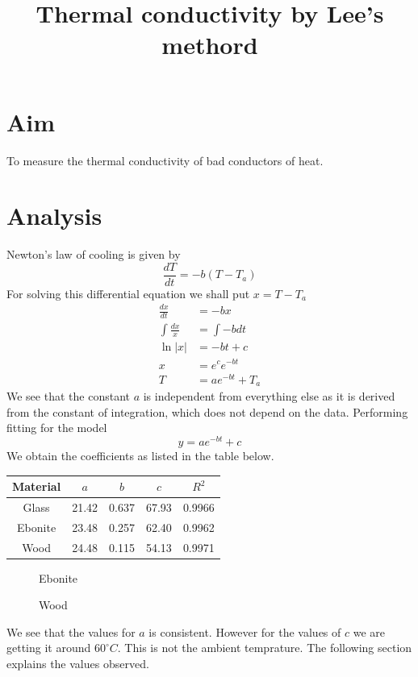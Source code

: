 \documentclass[12pt]{article}
\newlength\fwidth
\newlength\fheight
\begin{document}
\author{}
\date{}
\title{Thermal conductivity by Lee's methord}
\maketitle
\section*{Aim}
To measure the thermal conductivity of bad conductors of heat.
\section*{Analysis}
Newton's law of cooling is given by 
\[\frac{dT}{dt} = -b(T-T_a)\]
For solving this differential equation we shall put $x = T-T_a$
\begin{align*}
    \frac{dx}{dt} &= -bx \\
    \int \frac{dx}{x} &= \int -b dt \\
    \ln |x| &= -bt + c \\
    x &= e^ce^{-bt} \\
    T &= ae^{-bt} +T_a
\end{align*}
We see that the constant $a$ is independent from everything else as it is derived from the constant of integration, which does not depend on the data. 
Performing fitting for the model
\[y = ae^{-bt}+c\]
We obtain the coefficients as listed in the table below.
\begin{table}[H]
    \centering
    \begin{tabular}{|c|c|c|c|c|}
    \hline
        \textbf{Material} & $a$ & $b$ & $c$ & $R^2$ \\ \hline
        Glass & 21.42 & 0.637 & 67.93 & 0.9966 \\ \hline
        Ebonite & 23.48 & 0.257 & 62.40 & 0.9962 \\ \hline
        Wood & 24.48 & 0.115 & 54.13 & 0.9971 \\ \hline
    \end{tabular}
\end{table}

\begin{figure}[H]
    \centering
    \setlength{}
    \setlength{}
    \caption{Glass}
    
    \caption{Ebonite}
    
\end{figure}
\begin{figure}[H]
    \centering
    \setlength{}
    \setlength{}
    \caption{Wood}
    
\end{figure}
We see that the values for $a$ is consistent.
However for the values of $c$ we are getting it around $60^\circ C$.
This is not the ambient temprature.
The following section explains the values observed.
\end{document}
